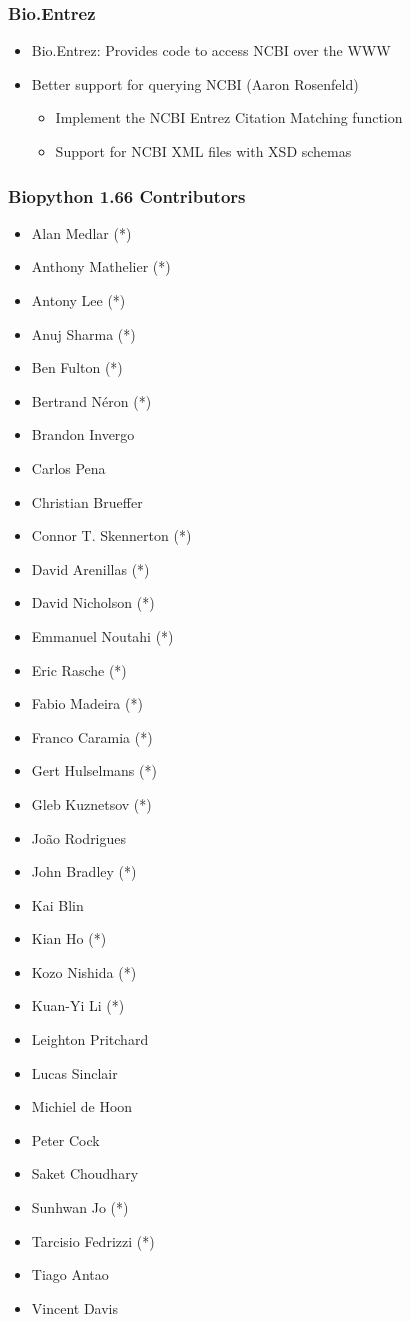 \documentclass[trans]{beamer}
\begin{document}
\frame
{
  \frametitle{Bio.Entrez}
  
  \begin{itemize}
  \item Bio.Entrez: Provides code to access NCBI over the WWW
  \item Better support for querying NCBI (Aaron Rosenfeld)
  \begin{itemize}
  \item Implement the NCBI Entrez Citation Matching function
  \item Support for NCBI XML files with XSD schemas
  \end{itemize}
  \end{itemize}  
}

\frame
{
  \frametitle{Biopython 1.66 Contributors}

  \scriptsize{
  \begin{multicols}{2}
  \begin{itemize}
  \item Alan Medlar (*)
  \item Anthony Mathelier (*)
  \item Antony Lee (*)
  \item Anuj Sharma (*)
  \item Ben Fulton (*)
  \item Bertrand Néron (*)
  \item Brandon Invergo
  \item Carlos Pena
  \item Christian Brueffer
  \item Connor T. Skennerton (*)
  \item David Arenillas (*)
  \item David Nicholson (*)
  \item Emmanuel Noutahi (*)
  \item Eric Rasche (*)
  \item Fabio Madeira (*)
  \item Franco Caramia (*)
  \item Gert Hulselmans (*)
  \item Gleb Kuznetsov (*)
  \item João Rodrigues
  \item John Bradley (*)
  \item Kai Blin
  \item Kian Ho (*)
  \item Kozo Nishida (*)
  \item Kuan-Yi Li (*)
  \item Leighton Pritchard
  \item Lucas Sinclair
  \item Michiel de Hoon
  \item Peter Cock
  \item Saket Choudhary
  \item Sunhwan Jo (*)
  \item Tarcisio Fedrizzi (*)
  \item Tiago Antao
  \item Vincent Davis
  \end{itemize}
  \end{multicols}
  }
}
\end{document}
